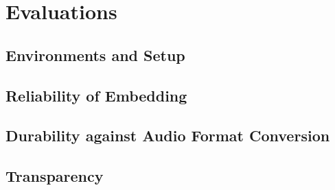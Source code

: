 \chapter{Evaluations}

\section{Environments and Setup}


\section{Reliability of Embedding}


\section{Durability against Audio Format Conversion}


\section{Transparency}


